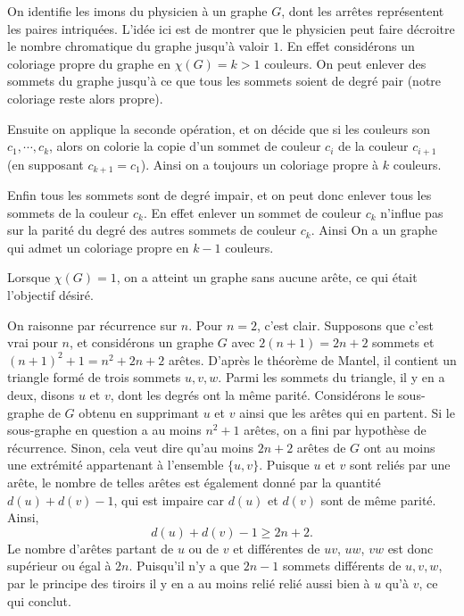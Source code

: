 \begin{sol}
On identifie les imons du physicien à un graphe $G$, dont les arrêtes représentent les paires intriquées.
L'idée ici est de montrer que le physicien peut faire décroitre le nombre chromatique du graphe jusqu'à valoir $1$. En effet considérons un coloriage propre du graphe en $\chi(G)=k>1$ couleurs. On peut enlever des sommets du graphe jusqu'à ce que tous les sommets soient de degré pair (notre coloriage reste alors propre).

 Ensuite on applique la seconde opération, et on décide que si les couleurs son $c_1,\cdots,c_k$, alors on colorie la copie d'un sommet de couleur $c_i$ de la couleur $c_{i+1}$ (en supposant $c_{k+1}=c_1$). Ainsi on a toujours un coloriage propre à $k$ couleurs.

 Enfin tous les sommets sont de degré impair, et on peut donc enlever tous les sommets de la couleur $c_k$. En effet enlever un sommet de couleur $c_k$ n'influe pas sur la parité du degré des autres sommets de couleur $c_k$. Ainsi On a un graphe qui admet un coloriage propre en $k-1$ couleurs.
 
 Lorsque $\chi(G)=1$, on a atteint un graphe sans aucune arête, ce qui était l'objectif désiré. 
\end{sol}

\begin{sol} On raisonne par récurrence sur $n$. Pour $n=2$, c'est clair. Supposons que c'est vrai pour $n$, et considérons un graphe $G$ avec $2(n+1) = 2n+2$ sommets et $(n+1)^2 + 1 = n^2 + 2n + 2$ arêtes. D'après le théorème de Mantel, il contient un triangle formé de trois sommets $u,v,w$. Parmi les sommets du triangle, il y en a deux, disons $u$ et $v$, dont les degrés ont la même parité. Considérons le sous-graphe de $G$ obtenu en supprimant $u$ et $v$ ainsi que les arêtes qui en partent. Si le sous-graphe en question a au moins $n^2 + 1$ arêtes, on a fini par hypothèse de récurrence. Sinon, cela veut dire qu'au moins $2n+2$ arêtes de $G$ ont au moins une extrémité appartenant à l'ensemble $\{u,v\}$. Puisque $u$ et $v$ sont reliés par une arête, le nombre de telles arêtes est également donné par la quantité $d(u) + d(v) - 1$, qui est impaire car $d(u)$ et $d(v)$ sont de même parité. Ainsi, 
$$d(u) + d(v) -1 \geq 2n+2.$$
Le nombre d'arêtes partant de $u$  ou de $v$ et différentes de $uv$, $uw$, $vw$ est donc supérieur ou égal à $2n$. Puisqu'il n'y a que $2n-1$ sommets différents de $u,v,w$, par le principe des tiroirs il y en a au moins relié relié aussi bien à $u$ qu'à $v$, ce qui conclut. 

\end{sol}

